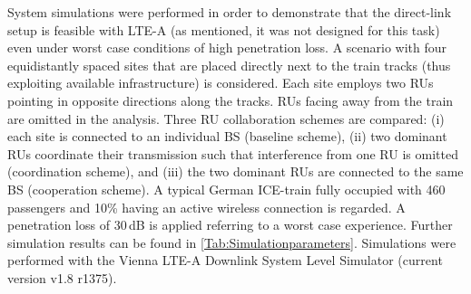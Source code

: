 \documentclass[a4paper,conference,twocolumn,10pt]{IEEEtran}
\begin{document}
System simulations were performed in order to demonstrate that the direct-link setup is feasible with \ac{LTE-A} (as mentioned, it was not designed for this task) even under worst case conditions of high penetration loss. A scenario with four equidistantly spaced sites that are placed directly next to the train tracks (thus exploiting available infrastructure) is considered. Each site employs two \acp{RU} pointing in opposite directions along the tracks. \acp{RU} facing away from the train are omitted in the analysis. Three \ac{RU} collaboration schemes are compared: (i) each site is connected to an individual \ac{BS} (baseline scheme), (ii) two dominant \acp{RU} coordinate their transmission such that interference from one \ac{RU} is omitted (coordination scheme), and (iii) the two dominant \acp{RU} are connected to the same \ac{BS} (cooperation scheme). A typical German ICE-train fully occupied with 460 passengers and 10\% having an active wireless connection is regarded. A penetration loss of 30\,dB is applied referring to a worst case experience. Further simulation results can be found in \cref{Tab:Simulationparameters}. Simulations were performed with the Vienna \ac{LTE-A} Downlink System Level Simulator \cite{ltesim2014} (current version v1.8 r1375).
\end{document}
